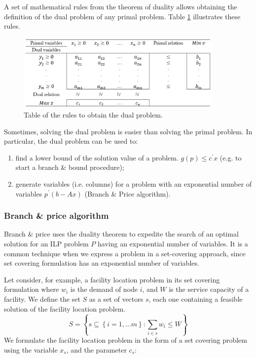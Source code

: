 A set of mathematical rules from the theorem of duality allows obtaining the definition of the dual problem of any primal problem. Table \ref{tab_duality} illustrates these rules.

\begin{figure}[hbt!]
\centering
\includegraphics[width=0.9\textwidth]{SectionLetsMath/prescriptive_fig/tab_duality.png}
\captionsetup{type=table}
\caption{Table of the rules to obtain the dual problem.}
\label{tab_duality}
\end{figure}

Sometimes, solving the dual problem is easier than solving the primal problem. In particular, the dual problem can be used to:
\begin{enumerate}
    \item find a lower bound of the solution value of a problem. $g\left(p\right)\le c^{\prime} x$ (e.g. to start a branch \& bound procedure);
    \item generate variables (i.e. columns) for a problem with an exponential number of variables $p^{\prime}\left(b-Ax\right)$ (Branch \& Price algorithm).
\end{enumerate}

\subsubsection{Branch \& price algorithm}
Branch \& price uses the duality theorem to expedite the search of an optimal solution for an ILP problem $P$ having an exponential number of variables. It is a common technique when we express a problem in a set-covering approach, since set covering formulation has an exponential number of variables.\par
Let consider, for example, a facility location problem in its set covering formulation where $w_i$ is the demand of node $i$, and $W$ is the service capacity of a facility. We define the set $S$ as a set of vectors $s$, each one containing a feasible solution of the facility location problem.
\begin{equation}
S=\left\{s\subseteq\left\{i=1,\ldots m\right\}:\sum_{i\in s}{w_i\le W}\right\}
\label{eq_dualProblemSetS}
\end{equation}
We formulate the facility location problem in the form of a set covering problem using  the variable $x_s$, and the parameter $c_s$:

